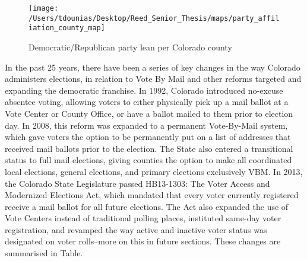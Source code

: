 \documentclass[12pt,twoside]{reedthesis}
\begin{document}
  \begin{figure}
  
  {\centering \texttt{[image: /Users/tdounias/Desktop/Reed\_Senior\_Thesis/maps/party\_affiliation\_county\_map]} 
  
  }
  
  \caption[Democratic/Republican party lean per Colorado county]{Democratic/Republican party lean per Colorado county}\label{fig:party reg per county map}
  \end{figure}
  
  In the past 25 years, there have been a series of key changes in the way
  Colorado administers elections, in relation to Vote By Mail and other
  reforms targeted and expanding the democratic franchise. In 1992,
  Colorado introduced no-excuse absentee voting, allowing voters to either
  physically pick up a mail ballot at a Vote Center or County Office, or
  have a ballot mailed to them prior to election day. In 2008, this reform
  was expanded to a permanent Vote-By-Mail system, which gave voters the
  option to be permanently put on a list of addresses that received mail
  ballots prior to the election. The State also entered a transitional
  status to full mail elections, giving counties the option to make all
  coordinated local elections, general elections, and primary elections
  exclusively VBM. In 2013, the Colorado State Legislature passed
  HB13-1303: The Voter Access and Modernized Elections Act, which mandated
  that every voter currently registered receive a mail ballot for all
  future elections. The Act also expanded the use of Vote Centers instead
  of traditional polling places, instituted same-day voter registration,
  and revamped the way active and inactive voter status was designated on
  voter rolls--more on this in future sections. These changes are
  summarised in Table.
  
\end{document}
